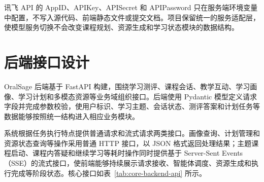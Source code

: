 讯飞 API 的 AppID、APIKey、APISecret 和 APIPassword 只在服务端环境变量中配置，不写入源代码、前端静态文件或提交文档。项目保留统一的服务适配层，使模型服务切换不会改变课程规划、资源生成和学习状态模块的数据结构。

\section{后端接口设计}

OralSage 后端基于 FastAPI 构建，围绕学习测评、课程会话、教学互动、学习画像、学习计划和多模态资源等业务域组织接口。后端使用 Pydantic 模型定义请求字段并完成参数校验，使用户标识、学习主题、会话状态、测评答案和计划任务等数据能够按照统一结构进入相应业务模块。

系统根据任务执行特点提供普通请求和流式请求两类接口。画像查询、计划管理和资源状态查询等操作采用普通 HTTP 接口，以 JSON 格式返回处理结果；主题课程启动、课程内答疑和继续学习等耗时操作同时提供基于 Server-Sent Events（SSE）的流式接口，使前端能够持续展示请求接收、智能体调度、资源生成和执行完成等阶段状态。核心接口如表~\ref{tab:core-backend-api} 所示。

